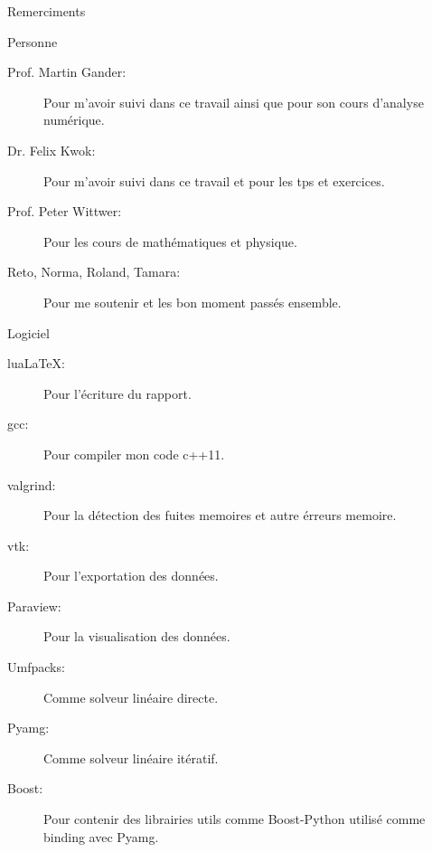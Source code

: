 \begin{frame}{Remerciments}

\begin{block}{Personne}

\begin{description}
 \item[Prof. Martin Gander:] Pour m'avoir suivi dans ce travail ainsi que pour son cours d'analyse numérique.
 \item[Dr. Felix Kwok:] Pour m'avoir suivi dans ce travail et pour les tps et exercices.
 \item[Prof. Peter Wittwer:] Pour les cours de mathématiques et physique.
 \item[Reto, Norma, Roland, Tamara:] Pour me soutenir et les bon moment passés ensemble.
\end{description}
 \end{block}
 
 \begin{block}{Logiciel}
  \begin{description}
   \item [lua\LaTeX:] Pour l'écriture du rapport.
   \item [gcc:] Pour compiler mon code c++11.
   \item [valgrind:] Pour la détection des fuites memoires et autre érreurs memoire.
   \item [vtk:] Pour l'exportation des données.
   \item [Paraview:] Pour la visualisation des données.
   \item [Umfpacks:] Comme solveur linéaire directe.
   \item [Pyamg:] Comme solveur linéaire itératif.
   \item [Boost:] Pour contenir des librairies utils comme Boost-Python utilisé comme binding avec Pyamg.
  \end{description}

 \end{block}

 
\end{frame}





